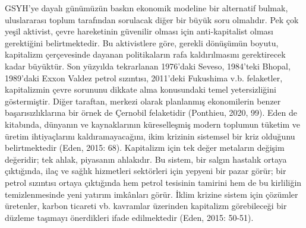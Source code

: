 \documentclass[
]{book}
\begin{document}
GSYH'ye dayalı günümüzün baskın ekonomik modeline bir alternatif bulmak, uluslararası toplum tarafından sorulacak diğer bir büyük soru olmalıdır. Pek çok yeşil aktivist, çevre hareketinin güvenilir olması için anti-kapitalist olması gerektiğini belirtmektedir. Bu aktivistlere göre, gerekli dönüşümün boyutu, kapitalizm çerçevesinde dayanan politikaların rafa kaldırılmasını gerektirecek kadar büyüktür. Son yüzyılda tekrarlanan 1976'daki Seveso, 1984'teki Bhopal, 1989'daki Exxon Valdez petrol sızıntısı, 2011'deki Fukushima v.b. felaketler, kapitalizmin çevre sorununu dikkate alma konusundaki temel yetersizliğini göstermiştir. Diğer taraftan, merkezi olarak planlanmış ekonomilerin benzer başarısızlıklarına bir örnek de Çernobil felaketidir (Ponthieu, 2020, 99). Eden de kitabında, dünyanın ve kaynaklarının küreselleşmiş modern toplumun tüketim ve üretim ihtiyaçlarını kaldıramayacağını, ikim krizinin sistemsel bir kriz olduğunu belirtmektedir (Eden, 2015: 68).
Kapitalizm için tek değer metaların değişim değeridir; tek ahlak, piyasanın ahlakıdır. Bu sistem, bir salgın hastalık ortaya çıktığında, ilaç ve sağlık hizmetleri sektörleri için yepyeni bir pazar görür; bir petrol sızıntısı ortaya çıktığında hem petrol tesisinin tamirini hem de bu kirliliğin temizlenmesinde yeni yatırım imkânları görür. İklim krizine sistem için çözümler üretenler, karbon ticareti vb. kavramlar üzerinden kapitalizm görebileceği bir düzleme taşımayı önerdikleri ifade edilmektedir (Eden, 2015: 50-51).
\end{document}
